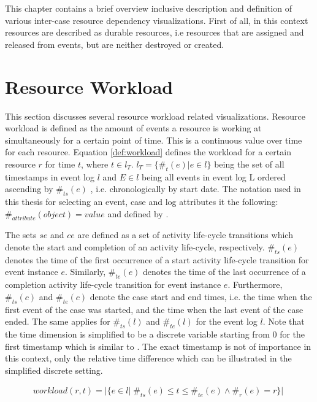 This chapter contains a brief overview inclusive description and definition of various inter-case resource dependency visualizations. First of all, in this context resources are described as durable resources, i.e resources that are assigned and released from events, but are neither destroyed or created.

\section{Resource Workload}
This section discusses several resource workload related visualizations. Resource workload is defined as the amount of events a resource is working at simultaneously for a certain point of time. This is a continuous value over time for each resource. Equation \ref{def:workload} defines the workload for a certain resource $r$ for time $t$, where $t \in l_T$. $l_T = \{\#_t(e) | e \in l \}$ being the set of all timestamps in event log $l$ and $E \in l$ being all events in event log L ordered ascending by $\#_{ts}(e)$ , i.e. chronologically by start date. The notation used in this thesis for selecting an event, case and log attributes it the following: $\#_{attribute}(object) = value$ and defined by \cite{aalst2016process}.

The sets $se$ and $ce$ are defined as a set of activity life-cycle transitions which denote the start and completion of an activity life-cycle, respectively. $\#_{ts}(e)$ denotes the time of the first occurrence of a start activity life-cycle transition for event instance $e$. Similarly, $\#_{te}(e)$ denotes the time of the last occurrence of a completion activity life-cycle transition for event instance $e$. Furthermore, $\#_{ts}(c)$ and $\#_{te}(c)$ denote the case start and end times, i.e. the time when the first event of the case was started, and the time when the last event of the case ended. The same applies for $\#_{ts}(l)$ and $\#_{te}(l)$ for the event log $l$. Note that the time dimension is simplified to be a discrete variable starting from $0$ for the first timestamp which is similar to \cite{aalst2016process}. The exact timestamp is not of importance in this context, only the relative time difference which can be illustrated in the simplified discrete setting.  

\begin{equation}\label{def:workload}
  \begin{array}{l}
    workload(r,t) =  
    | \{e \in l | \; \#_{ts}(e)  \leq t \leq \#_{te}(e) \wedge \#_r(e)=r\}| \; 
  \end{array}
\end{equation}

